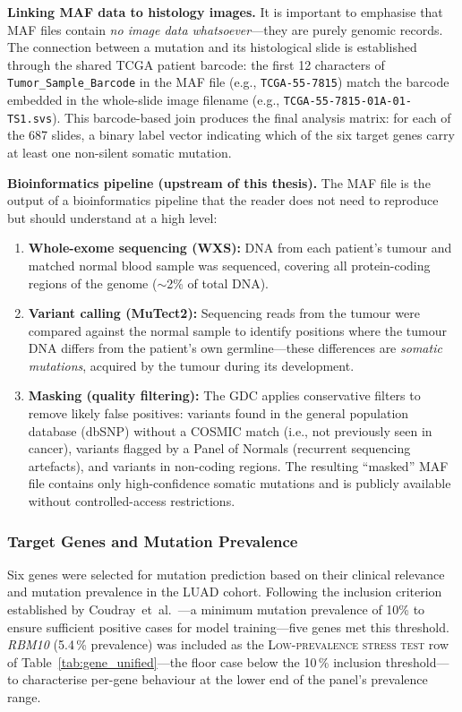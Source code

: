 \textbf{Linking MAF data to histology images.}
It is important to emphasise that MAF files contain \emph{no image
data whatsoever}---they are purely genomic records.
The connection between a mutation and its histological slide is
established through the shared TCGA patient barcode: the first 12
characters of \texttt{Tumor\_Sample\_Barcode} in the MAF file
(e.g., \texttt{TCGA-55-7815}) match the barcode embedded in the
whole-slide image filename
(e.g., \texttt{TCGA-55-7815-01A-01-TS1.svs}).
This barcode-based join produces the final analysis matrix: for each
of the 687 slides, a binary label vector indicating which of the six
target genes carry at least one non-silent somatic mutation.

\textbf{Bioinformatics pipeline (upstream of this thesis).}
The MAF file is the output of a bioinformatics pipeline that the reader
does not need to reproduce but should understand at a high level:
\begin{enumerate}
    \item \textbf{Whole-exome sequencing (WXS):} DNA from each patient's
    tumour and matched normal blood sample was sequenced, covering all
    protein-coding regions of the genome ($\sim$2\% of total DNA).
    \item \textbf{Variant calling (MuTect2):} Sequencing reads from
    the tumour were compared against the normal sample to identify
    positions where the tumour DNA differs from the patient's own
    germline---these differences are \emph{somatic mutations},
    acquired by the tumour during its development.
    \item \textbf{Masking (quality filtering):} The GDC applies
    conservative filters to remove likely false positives: variants
    found in the general population database (dbSNP) without a COSMIC
    match (i.e., not previously seen in cancer), variants flagged by a
    Panel of Normals (recurrent sequencing artefacts), and variants in
    non-coding regions.
    The resulting ``masked'' MAF file contains only high-confidence
    somatic mutations and is publicly available without
    controlled-access restrictions.
\end{enumerate}


\subsubsection{Target Genes and Mutation Prevalence}
\label{sec:uc:tcga:genes}

Six genes were selected for mutation prediction based on their clinical
relevance and mutation prevalence in the LUAD cohort.
Following the inclusion criterion established by
Coudray~et~al.~\cite{coudray2018classification}---a minimum mutation
prevalence of 10\% to ensure sufficient positive cases for model
training---five genes met this threshold.
\textit{RBM10} (5.4\,\% prevalence) was included as the
\textsc{Low-prevalence stress test} row of
Table~\ref{tab:gene_unified}---the floor case below the 10\,\%
inclusion threshold---to characterise per-gene behaviour at the
lower end of the panel's prevalence range.

